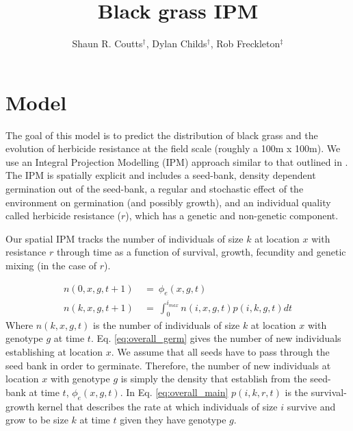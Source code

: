 \documentclass[12pt, a4paper]{article}
\begin{document}
\title{Black grass IPM}
\author{Shaun R. Coutts$^\dag$, Dylan Childs$^\dag$, Rob Freckleton$^\ddag$}
\maketitle

\section{Model}
The goal of this model is to predict the distribution of black grass and the evolution of herbicide resistance at the field scale (roughly a 100m x 100m). We use an Integral Projection Modelling (IPM) approach similar to that outlined in \cite{Elln2006}. The IPM is spatially explicit and includes a seed-bank, density dependent germination out of the seed-bank, a regular and stochastic effect of the environment on germination (and possibly growth), and an individual quality called herbicide resistance ($r$), which has a genetic and non-genetic component. 

Our spatial IPM tracks the number of individuals of size $k$ at location $x$ with resistance $r$ through time as a function of survival, growth, fecundity and genetic mixing (in the case of $r$).

\begin{subequations}
\label{eq:overall}
\begin{align}
	\label{eq:overall_germ}
	n(0, x, g, t + 1) &~=~ \phi_e(x, g, t) \\
	\label{eq:overall_main}
	n(k, x, g, t + 1) &~=~ \displaystyle\int_0^{i_{max}} n(i, x, g, t)p(i, k, g, t)dt	 
\end{align}
\end{subequations}
Where $n(k, x, g, t)$ is the number of individuals of size $k$ at location $x$ with genotype $g$ at time $t$. Eq. \ref{eq:overall_germ} gives the number of new individuals establishing at location $x$. We assume that all seeds have to pass through the seed bank in order to germinate. Therefore, the number of new individuals at location $x$ with genotype $g$ is simply the density that establish from the seed-bank at time $t$, $\phi_e(x, g, t)$. In Eq. \ref{eq:overall_main} $p(i, k, r, t)$ is the survival-growth kernel that describes the rate at which individuals of size $i$ survive and grow to be size $k$ at time $t$ given they have genotype $g$.  
\end{document}

